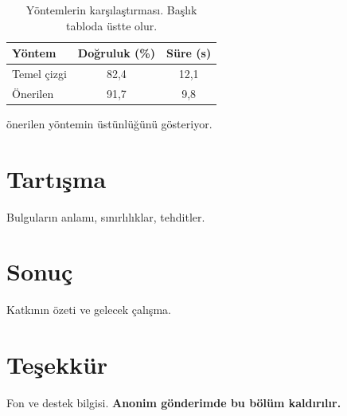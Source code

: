 \documentclass[12pt,a4paper]{article}
\begin{document}
\begin{table}[htbp]
  \centering
  \caption{Yöntemlerin karşılaştırması. Başlık tabloda üstte olur.}
  \label{tab:sonuc}
  \begin{tabular}{l S[table-format=2.1] S[table-format=2.1]}
    \toprule
    Yöntem & {Doğruluk (\%)} & {Süre (s)} \\
    \midrule
    Temel çizgi & 82,4 & 12,1 \\
    Önerilen    & 91,7 &  9,8 \\
    \bottomrule
  \end{tabular}
\end{table}

 önerilen yöntemin üstünlüğünü gösteriyor.


\section{Tartışma}
\label{sec:tartisma}
Bulguların anlamı, sınırlılıklar, tehditler.

\section{Sonuç}
\label{sec:sonuc}
Katkının özeti ve gelecek çalışma.

\section*{Teşekkür}
Fon ve destek bilgisi. \textbf{Anonim gönderimde bu bölüm kaldırılır.}

\printbibliography[title={Kaynaklar}]
\end{document}
